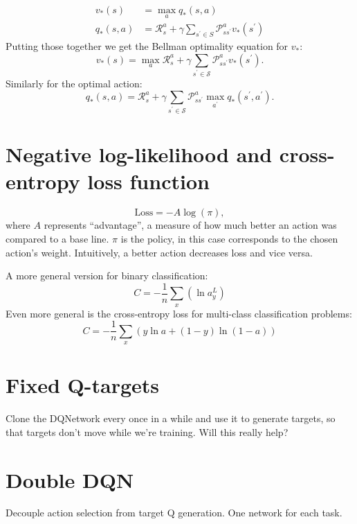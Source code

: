 \documentclass[20pt]{extarticle}
\theoremstyle{plain}
\theoremstyle{definition}
\theoremstyle{remark}
\newcommand{\0}{\varnothing}
\newcommand{\<}{\langle}
\renewcommand{\>}{\rangle}
\begin{document}
\begin{align*}
v _ { * } ( s ) &= \max _ { a } q _ { * } ( s , a ) \\
q _ { * } ( s , a ) &= \mathcal { R } _ { s } ^ { a } + \gamma \sum _ { s ^ { \prime } \in S } \mathcal { P } _ { s s ^ { ' } } ^ { a } v _ { * } \left( s ^ { \prime } \right)
\end{align*}
Putting those together we get the Bellman optimality equation for \( v_*: \)
\[
v _ { * } ( s ) = \max _ { a } \mathcal { R } _ { s } ^ { a } + \gamma \sum _ { s ^ { \prime } \in \mathcal { S } } \mathcal { P } _ { s s ^ { \prime } } ^ { a } v _ { * } \left( s ^ { \prime } \right).
\]
Similarly for the optimal action:
\[
q _ { * } ( s , a ) = \mathcal { R } _ { s } ^ { a } + \gamma \sum _ { s ^ { \prime } \in \mathcal { S } } \mathcal { P } _ { s s ^ { \prime } } ^ { a } \max _ { a ^ { \prime } } q _ { * } \left( s ^ { \prime } , a ^ { \prime } \right).
\]

\section{Negative log-likelihood and cross-entropy loss function}

\[
\text{Loss} = - A \log(\pi),
\]
where \( A \) represents ``advantage'', a measure of how much better an action was
compared to a base line. \( \pi \) is the policy, in this case corresponds to
the chosen action's weight. Intuitively, a better action decreases loss and vice
versa.

A more general version for binary classification:
\[
C = - \frac { 1 } { n } \sum _ { x } \left( \ln a _ { y } ^ { L } \right)
\]
Even more general is the cross-entropy loss for multi-class classification problems:
\[
C = - \frac { 1 } { n } \sum _ { x } ( y \ln a + ( 1 - y ) \ln ( 1 - a ) )
\]

\section{Fixed Q-targets}

Clone the DQNetwork every once in a while and use it to generate targets, so that targets don't move while we're training. Will this really help?

\section{Double DQN}

Decouple action selection from target Q generation. One network for each task.
\end{document}
